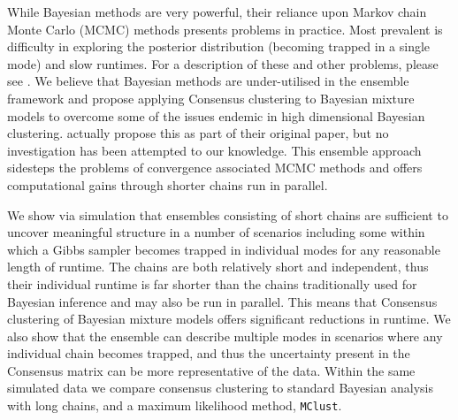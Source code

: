 \documentclass{bioinfo}
\begin{document}


While Bayesian methods are very powerful, their reliance upon Markov chain Monte Carlo (MCMC) methods presents problems in practice. Most prevalent is difficulty in exploring the posterior distribution (becoming trapped in a single mode) and slow runtimes. For a description of these and other problems, please see \cite{robert2018accelerating, yao2020stacking, chandra2020bayesian}. We believe that Bayesian methods are under-utilised in the ensemble framework and propose applying Consensus clustering to Bayesian mixture models to overcome some of the issues endemic in high dimensional Bayesian clustering. \cite{monti2003consensus} actually propose this as part of their original paper, but no investigation has been attempted to our knowledge. This ensemble approach  sidesteps the problems of convergence associated MCMC methods and offers computational gains through shorter chains run in parallel. 

We show via simulation that ensembles consisting of short chains are sufficient to uncover meaningful structure in a number of scenarios including some within which a Gibbs sampler becomes trapped in individual modes for any reasonable length of runtime. The chains are both relatively short and independent, thus their individual runtime is far shorter than the chains traditionally used for Bayesian inference and may also be run in parallel. This means that Consensus clustering of Bayesian mixture models offers significant reductions in runtime. We also show that the ensemble can describe multiple modes in scenarios where any individual chain becomes trapped, and thus the uncertainty present in the Consensus matrix can be more representative of the data. Within the same simulated data we compare consensus clustering to standard Bayesian analysis with long chains, and a maximum likelihood method, \texttt{MClust}.
\end{document}
